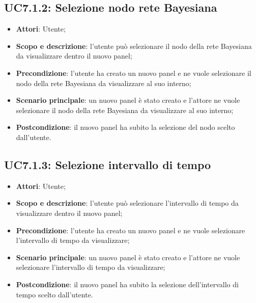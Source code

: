\subsection{UC7.1.2: Selezione nodo rete Bayesiana }
\hypertarget{UC7.1.2}{}
\begin{itemize}
	\item \textbf{Attori}: Utente;
	\item \textbf{Scopo e descrizione}: l'utente può selezionare il nodo della rete Bayesiana da visualizzare dentro il nuovo panel;
	\item \textbf{Precondizione}: l'utente ha creato un nuovo panel e ne  vuole selezionare il nodo della rete Bayesiana da visualizzare al suo interno;
	\item \textbf{Scenario principale}: un nuovo panel è stato creato e l'attore ne vuole selezionare il nodo della rete Bayesiana da visualizzare al suo interno;
	\item \textbf{Postcondizione}: il nuovo panel ha subito la selezione del nodo scelto dall'utente.
\end{itemize}
\subsection{UC7.1.3: Selezione intervallo di tempo }
\hypertarget{UC7.1.3}{}
\begin{itemize}
	\item \textbf{Attori}: Utente;
	\item \textbf{Scopo e descrizione}: l'utente può selezionare l'intervallo di tempo da visualizzare dentro il nuovo panel;
	\item \textbf{Precondizione}: l'utente ha creato un nuovo panel e ne vuole selezionare l'intervallo di tempo da visualizzare;
	\item \textbf{Scenario principale}: un nuovo panel è stato creato e l'attore ne vuole selezionare l'intervallo di tempo da visualizzare;
	\item \textbf{Postcondizione}: il nuovo panel ha subito la selezione dell'intervallo di tempo scelto dall'utente.
\end{itemize}
